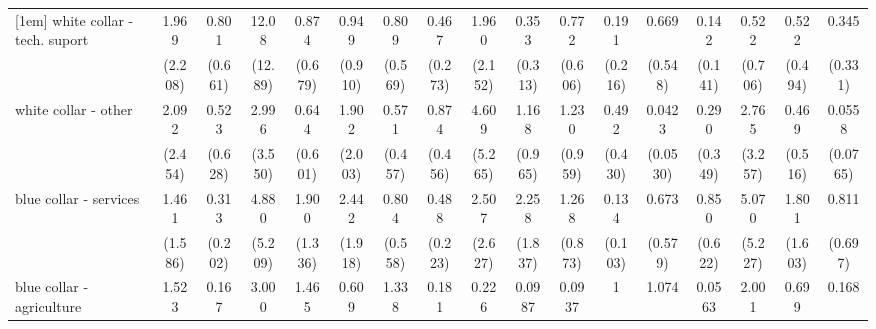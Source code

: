 {\begin{tabular}{l*{16}{c}}
[1em]
white collar - tech. suport&       1.969         &       0.801         &       12.08\sym{*}  &       0.874         &       0.949         &       0.809         &       0.467         &       1.960         &       0.353         &       0.772         &       0.191         &       0.669         &       0.142\sym{*}  &       0.522         &       0.522         &       0.345         \\
                    &     (2.208)         &     (0.661)         &     (12.89)         &     (0.679)         &     (0.910)         &     (0.569)         &     (0.273)         &     (2.152)         &     (0.313)         &     (0.606)         &     (0.216)         &     (0.548)         &     (0.141)         &     (0.706)         &     (0.494)         &     (0.331)         \\
[1em]
white collar - other&       2.092         &       0.523         &       2.996         &       0.644         &       1.902         &       0.571         &       0.874         &       4.609         &       1.168         &       1.230         &       0.492         &      0.0423\sym{*}  &       0.290         &       2.765         &       0.469         &      0.0558\sym{*}  \\
                    &     (2.454)         &     (0.628)         &     (3.550)         &     (0.601)         &     (2.003)         &     (0.457)         &     (0.456)         &     (5.265)         &     (0.965)         &     (0.959)         &     (0.430)         &    (0.0530)         &     (0.349)         &     (3.257)         &     (0.516)         &    (0.0765)         \\
[1em]
blue collar - services&       1.461         &       0.313         &       4.880         &       1.900         &       2.442         &       0.804         &       0.488         &       2.507         &       2.258         &       1.268         &       0.134\sym{**} &       0.673         &       0.850         &       5.070         &       1.801         &       0.811         \\
                    &     (1.586)         &     (0.202)         &     (5.209)         &     (1.336)         &     (1.918)         &     (0.558)         &     (0.223)         &     (2.627)         &     (1.837)         &     (0.873)         &     (0.103)         &     (0.579)         &     (0.622)         &     (5.227)         &     (1.603)         &     (0.697)         \\
[1em]
blue collar - agriculture&       1.523         &       0.167         &       3.000         &       1.465         &       0.609         &       1.338         &       0.181\sym{*}  &       0.226         &      0.0987         &      0.0937\sym{*}  &           1         &       1.074         &      0.0563\sym{*}  &       2.001         &       0.699         &       0.168         \\

\end{tabular}}
